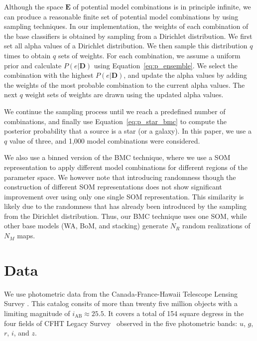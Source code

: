 \documentclass[useAMS,usenatbib]{mn2e}
\begin{document}
Although the space $\mathbf{E}$ of potential model combinations
is in principle infinite,
we can produce a reasonable finite set
of potential model combinations by using sampling techniques.
In our implementation,
the weights of each combination of the base classifiers
is obtained by sampling from a Dirichlet distribution.
We first set all alpha values of a Dirichlet distribution.
We then sample this distribution $q$ times
to obtain $q$ sets of weights.
For each combination,
we assume a uniform prior and
calculate $P\left(e|\mathbf{D}\right)$ using Equation~\ref{eq:p_ensemble}.
We select the combination with the highest $P\left(e|\mathbf{D}\right)$,
and update the alpha values by
adding the weights of the most probable combination
to the current alpha values.
The next $q$ weight sets of weights are drawn
using the updated alpha values.

We continue the sampling process until
we reach a predefined number of combinations,
and finally use Equation~\ref{eq:p_star_bmc} to compute
the posterior probability that a source is a star (or a galaxy).
In this paper, we use a $q$ value of three,
and 1,000 model combinations were considered.


We also use a binned version of the BMC technique,
where we use a SOM representation
to apply different model combinations
for different regions of the parameter space.
We however note that introducing randomness
though the construction of different SOM representations
does not show significant
improvement over using only one single SOM representation.
This similarity is likely due to the randomness 
that has already been introduced by 
the sampling from the Dirichlet distribution.
Thus, our BMC technique uses one SOM,
while other base models (WA, BoM, and stacking)
generate $N_R$ random realizations of $N_M$ maps.


\section{Data}
  \label{section:data}

We use photometric data from
the Canada-France-Hawaii Telescope Lensing Survey
\cite[CFHTLenS\footnote{http://www.cfhtlens.org/};][]
{Heymans2012,Erben2013,Hildebrandt2012}.
This catalog consits of more than twenty five million objects
with a limiting magnitude of $i_{\text{AB}} \approx 25.5$. 
It covers a total of 154 square degress
in the four fields of CFHT Legacy Survey~\citep[CFHTLS;][]{gwyn2012canada}
observed in the five photometric bands:
$u$, $g$, $r$, $i$, and $z$.
\end{document}
